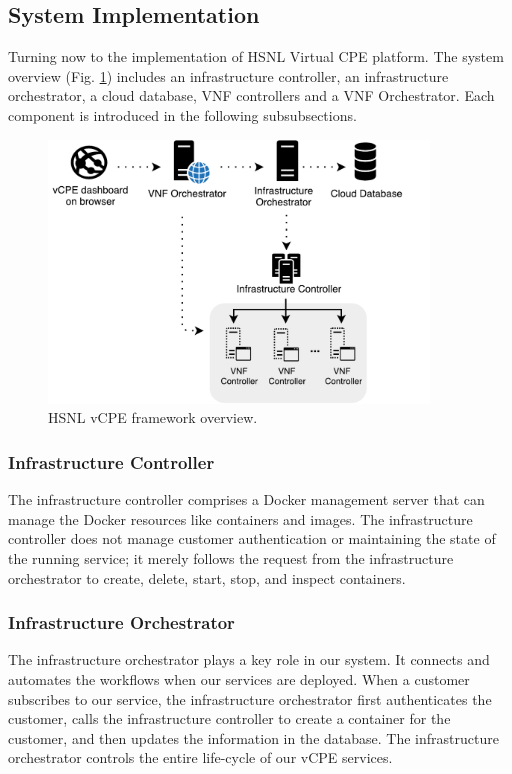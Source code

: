 \subsection{System Implementation} \label{ssec:hsnl_system_imple}
Turning now to the implementation of HSNL Virtual CPE platform.  The system overview (Fig. \ref{fig:hsnl_vcpe_framework}) includes an infrastructure controller, an infrastructure orchestrator, a cloud database, VNF controllers and a VNF Orchestrator. Each component is introduced in the following subsubsections.

\begin{figure}[!t]
\centering
\includegraphics[width=0.9\textwidth]{./fig/hsnl_vcpe_framework}
\caption{HSNL vCPE framework overview.}
\label{fig:hsnl_vcpe_framework}
\end{figure}

\subsubsection{Infrastructure Controller}
The infrastructure controller comprises a Docker management server that can manage the Docker resources like containers and images. The infrastructure controller does not manage customer authentication or maintaining the state of the running service; it merely follows the request from the infrastructure orchestrator to create, delete, start, stop, and inspect containers.

\subsubsection{Infrastructure Orchestrator}
The infrastructure orchestrator plays a key role in our system. It connects and automates the workflows when our services are deployed. When a customer subscribes to our service, the infrastructure orchestrator first authenticates the customer, calls the infrastructure controller to create a container for the customer, and then updates the information in the database. The infrastructure orchestrator controls the entire life-cycle of our vCPE services.

